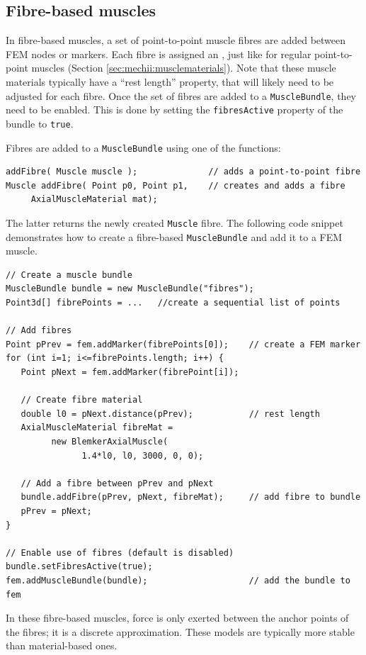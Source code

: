 \subsection{Fibre-based muscles}
\label{sec:fem:fibremuscle}

In fibre-based muscles, a set of point-to-point muscle fibres are added between
FEM nodes or markers.  Each fibre is assigned an 
, just like for 
regular point-to-point muscles (Section \ref{sec:mechii:musclematerials}).  Note
that these muscle materials typically have a ``rest length'' property, that will
likely need to be adjusted for each fibre.  Once the set of fibres are added
to a {\tt MuscleBundle}, they need to be enabled.  This is done by setting
the {\tt fibresActive} property of the bundle to {\tt true}.

Fibres are added to a {\tt MuscleBundle} using one of the functions:
\begin{lstlisting}[]
addFibre( Muscle muscle );              // adds a point-to-point fibre
Muscle addFibre( Point p0, Point p1,    // creates and adds a fibre
	 AxialMuscleMaterial mat);
\end{lstlisting}
The latter returns the newly created {\tt Muscle} fibre.  
The following code snippet demonstrates how to create a fibre-based 
{\tt MuscleBundle} and add it to a FEM muscle.
\lstset{numbers=left}
\begin{lstlisting}[]
// Create a muscle bundle
MuscleBundle bundle = new MuscleBundle("fibres");
Point3d[] fibrePoints = ...   //create a sequential list of points

// Add fibres
Point pPrev = fem.addMarker(fibrePoints[0]);    // create a FEM marker
for (int i=1; i<=fibrePoints.length; i++) {
   Point pNext = fem.addMarker(fibrePoint[i]);

   // Create fibre material
   double l0 = pNext.distance(pPrev);           // rest length
   AxialMuscleMaterial fibreMat = 
         new BlemkerAxialMuscle(
               1.4*l0, l0, 3000, 0, 0);

   // Add a fibre between pPrev and pNext
   bundle.addFibre(pPrev, pNext, fibreMat);     // add fibre to bundle
   pPrev = pNext;
}

// Enable use of fibres (default is disabled)
bundle.setFibresActive(true);
fem.addMuscleBundle(bundle);                    // add the bundle to fem
\end{lstlisting}
\lstset{numbers=none}

In these fibre-based muscles, force is only exerted between the anchor
points of the fibres; it is a discrete approximation.  These models
are typically more stable than material-based ones.

